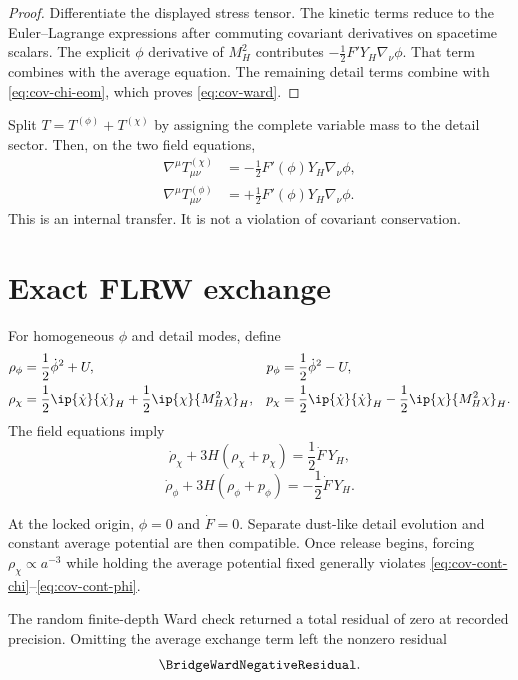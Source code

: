\begin{proof}
Differentiate the displayed stress tensor.  The kinetic terms reduce to the Euler--Lagrange expressions after commuting covariant derivatives on spacetime scalars.  The explicit $\phi$ derivative of $M_H^2$ contributes $-\tfrac12F'Y_H\nabla_\nu\phi$.  That term combines with the average equation.  The remaining detail terms combine with \eqref{eq:cov-chi-eom}, which proves \eqref{eq:cov-ward}.
\end{proof}

Split $T=T^{(\phi)}+T^{(\chi)}$ by assigning the complete variable mass to the detail sector.  Then, on the two field equations,
\begin{align}
\nabla^\mu T^{(\chi)}_{\mu\nu}
&=-\frac12F'(\phi)Y_H\nabla_\nu\phi,
\label{eq:cov-exchange-chi}\\
\nabla^\mu T^{(\phi)}_{\mu\nu}
&=+\frac12F'(\phi)Y_H\nabla_\nu\phi.
\label{eq:cov-exchange-phi}
\end{align}
This is an internal transfer.  It is not a violation of covariant conservation.

\section{Exact FLRW exchange}

For homogeneous $\phi$ and detail modes, define
\begin{align}
\rho_\phi&=\frac12\dot\phi^2+U,
&p_\phi&=\frac12\dot\phi^2-U,\\
\rho_\chi&=\frac12\ip{\dot\chi}{\dot\chi}_H
+\frac12\ip{\chi}{M_H^2\chi}_H,
&p_\chi&=\frac12\ip{\dot\chi}{\dot\chi}_H
-\frac12\ip{\chi}{M_H^2\chi}_H.
\end{align}
The field equations imply
\begin{equation}
\boxed{
\dot\rho_\chi+3H(\rho_\chi+p_\chi)
=\frac12\dot F\,Y_H,}
\label{eq:cov-cont-chi}
\end{equation}
\begin{equation}
\boxed{
\dot\rho_\phi+3H(\rho_\phi+p_\phi)
=-\frac12\dot F\,Y_H.}
\label{eq:cov-cont-phi}
\end{equation}

At the locked origin, $\phi=0$ and $\dot F=0$.  Separate dust-like detail evolution and constant average potential are then compatible.  Once release begins, forcing $\rho_\chi\propto a^{-3}$ while holding the average potential fixed generally violates \eqref{eq:cov-cont-chi}--\eqref{eq:cov-cont-phi}.

The random finite-depth Ward check returned a total residual of zero at recorded precision.  Omitting the average exchange term left the nonzero residual
\begin{equation}
\BridgeWardNegativeResidual.
\end{equation}

